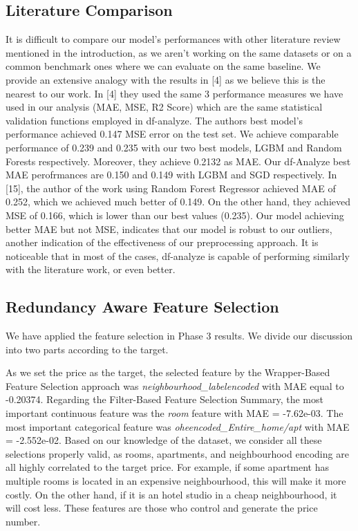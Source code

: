 \documentclass[a4paper,12pt]{article}
\begin{document}
\subsection*{Literature Comparison}

It is difficult to compare our model's performances with other literature review mentioned in the introduction, as we aren't working on the same datasets or on a common benchmark ones where we can evaluate on the same baseline. We provide an extensive analogy with the results in [4] as we believe this is the nearest to our work. In [4] they used the same 3 performance measures we have used in our analysis (MAE, MSE, R2 Score) which are the same statistical validation functions employed in df-analyze. The authors best model's performance achieved 0.147 MSE error on the test set. We achieve comparable performance of 0.239 and 0.235 with our two best models, LGBM and Random Forests respectively. Moreover, they achieve 0.2132 as MAE. Our df-Analyze best MAE perofrmances are 0.150 and 0.149 with LGBM and SGD respectively. In [15], the author of the work using Random Forest Regressor achieved MAE of 0.252, which we achieved much better of 0.149. On the other hand, they achieved MSE of 0.166, which is lower than our best values (0.235). Our model achieving better MAE but not MSE, indicates that our model is robust to our outliers, another indication of the effectiveness of our preprocessing approach. It is noticeable that in most of the cases, df-analyze is capable of performing similarly with the literature work, or even better.

\subsection*{Redundancy Aware Feature Selection}

We have applied the feature selection in Phase 3 results. We divide our discussion into two parts according to the target. 

As we set the price as the target, the selected feature by the Wrapper-Based Feature Selection approach was \textit{neighbourhood\_labelencoded} with MAE equal to -0.20374. Regarding the Filter-Based Feature Selection Summary, the most important continuous feature was the \textit{room} feature with MAE = -7.62e-03. \newline
The most important categorical feature was \textit{oheencoded\_Entire\_home/apt} with MAE = -2.552e-02. Based on our knowledge of the dataset, we consider all these selections properly valid, as rooms, apartments, and neighbourhood encoding are all highly correlated to the target price. For example, if some apartment has multiple rooms is located in an expensive neighbourhood, this will make it more costly. On the other hand, if it is an hotel studio in a cheap neighbourhood, it will cost less. These features are those who control and generate the price number.
\end{document}
